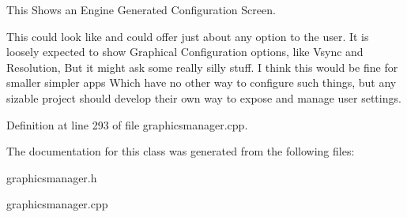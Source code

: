This Shows an Engine Generated Configuration Screen. 

This could look like and could offer just about any option to the user. It is loosely expected to show Graphical Configuration options, like Vsync and Resolution, But it might ask some really silly stuff. I think this would be fine for smaller simpler apps Which have no other way to configure such things, but any sizable project should develop their own way to expose and manage user settings. 

Definition at line 293 of file graphicsmanager.cpp.



The documentation for this class was generated from the following files:\begin{DoxyCompactItemize}
\item 
graphicsmanager.h\item 
graphicsmanager.cpp\end{DoxyCompactItemize}

